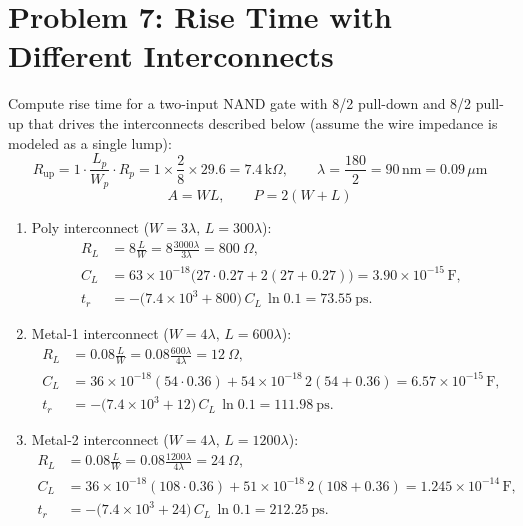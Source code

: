 \documentclass[11pt]{article}
\begin{document}
\clearpage

\section*{Problem 7: Rise Time with Different Interconnects}
Compute rise time for a two-input NAND gate with 8/2 pull-down and 8/2 pull-up that drives the interconnects described below (assume the wire impedance is modeled as a single lump):
\[
R_{\text{up}} = 1 \cdot \frac{L_p}{W_p} \cdot R_p = 1 \times \frac{2}{8} \times 29.6 = 7.4\,\text{k}\Omega,\qquad \lambda = \frac{180}{2} = 90\,\text{nm} = 0.09\,\mu\text{m}
\]
\[
A = WL,\qquad P = 2(W + L)
\]
\begin{enumerate}[label={\bfseries\alph*)}, itemsep=2ex]
    \item Poly interconnect ($W = 3\lambda,\, L = 300\lambda$):
    \begin{align*}
    R_L &= 8\frac{L}{W} = 8\frac{3000\lambda}{3\lambda} = 800~\Omega,\\
    C_L &= 63\times10^{-18}\big(27\cdot0.27 + 2(27 + 0.27)\big) = 3.90\times10^{-15}\,\text{F},\\
    t_r &= -\big(7.4\times10^{3} + 800\big)\,C_L\,\ln 0.1 = 73.55~\text{ps}.
    \end{align*}

    \item Metal-1 interconnect ($W = 4\lambda,\, L = 600\lambda$):
    \begin{align*}
    R_L &= 0.08\frac{L}{W} = 0.08\frac{600\lambda}{4\lambda} = 12~\Omega,\\
    C_L &= 36\times10^{-18}(54\cdot0.36) + 54\times10^{-18}\,2(54 + 0.36) = 6.57\times10^{-15}\,\text{F},\\
    t_r &= -\big(7.4\times10^{3} + 12\big)\,C_L\,\ln 0.1 = 111.98~\text{ps}.
    \end{align*}

    \item Metal-2 interconnect ($W = 4\lambda,\, L = 1200\lambda$):
    \begin{align*}
    R_L &= 0.08\frac{L}{W} = 0.08\frac{1200\lambda}{4\lambda} = 24~\Omega,\\
    C_L &= 36\times10^{-18}(108\cdot0.36) + 51\times10^{-18}\,2(108 + 0.36) = 1.245\times10^{-14}\,\text{F},\\
    t_r &= -\big(7.4\times10^{3} + 24\big)\,C_L\,\ln 0.1 = 212.25~\text{ps}.
    \end{align*}
\end{enumerate}
\end{document}

